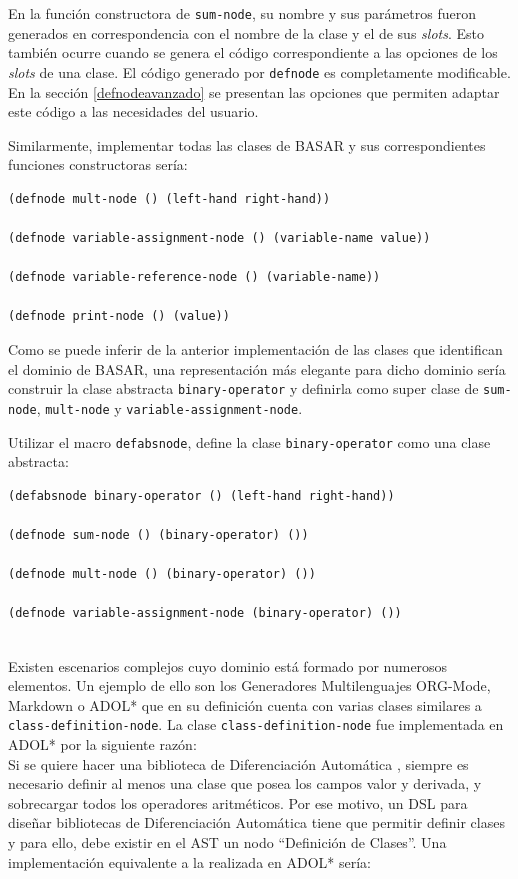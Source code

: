 En la función constructora de \texttt{sum-node}, su nombre y sus parámetros fueron generados en correspondencia con el nombre de la clase y el de sus \textit{slots}. Esto también ocurre cuando se genera el código correspondiente a las opciones de los \textit{slots} de una clase. El código generado por \texttt{defnode} es completamente modificable. En la sección \ref{defnodeavanzado} se presentan las opciones que permiten adaptar este código a las necesidades del usuario.

Similarmente, implementar todas las clases de BASAR y sus correspondientes funciones constructoras sería: 

\begin{verbatim}
(defnode mult-node () (left-hand right-hand))

(defnode variable-assignment-node () (variable-name value))

(defnode variable-reference-node () (variable-name))

(defnode print-node () (value))
\end{verbatim}

Como se puede inferir de la anterior implementación  de las clases que identifican el dominio de BASAR, una representación más elegante para dicho dominio sería construir la clase abstracta \texttt{binary-operator} y definirla como super clase de \texttt{sum-node}, \texttt{mult-node} y \texttt{variable-assignment-node}.   

Utilizar el macro \texttt{defabsnode}, define la clase \texttt{binary-operator} como una clase abstracta:

\begin{verbatim}
(defabsnode binary-operator () (left-hand right-hand))
                    
(defnode sum-node () (binary-operator) ())
                    
(defnode mult-node () (binary-operator) ())
                    
(defnode variable-assignment-node (binary-operator) ())
                    
\end{verbatim}

Existen escenarios complejos cuyo dominio está formado por numerosos elementos. Un ejemplo de ello son los Generadores Multilenguajes ORG-Mode, Markdown o ADOL* que en su definición cuenta con varias clases similares a \texttt{class-definition-node}. La clase \texttt{class-definition-node} fue implementada en ADOL* por la siguiente razón:\\
Si se quiere hacer una biblioteca de Diferenciación Automática \cite{Da}, siempre es necesario definir al menos una clase que posea los campos valor y derivada, y sobrecargar todos los operadores aritméticos. Por ese motivo, un DSL para diseñar bibliotecas de Diferenciación Automática tiene que permitir definir clases y para ello, debe existir en el AST un nodo “Definición de Clases”. Una implementación equivalente a la realizada en ADOL* sería: 

